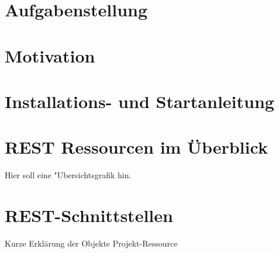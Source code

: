 \documentclass[12pt]{scrartcl}
\begin{document}
\section{Aufgabenstellung}
\section{Motivation}
\section{Installations- und Startanleitung}
\section{REST Ressourcen im Überblick}
Hier soll eine "Ubersichtsgrafik hin.
\section{REST-Schnittstellen}
Kurze Erklärung der Objekte
Projekt-Ressource
\end{document}

